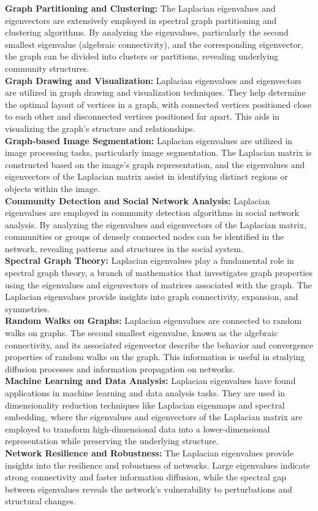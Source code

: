 \documentclass{article}
\begin{document}
    \textbf {Graph Partitioning and Clustering:} The Laplacian eigenvalues and eigenvectors are extensively employed in spectral graph partitioning and clustering algorithms. By analyzing the eigenvalues, particularly the second smallest eigenvalue (algebraic connectivity), and the corresponding eigenvector, the graph can be divided into clusters or partitions, revealing underlying community structures.\\
    \textbf {Graph Drawing and Visualization:} Laplacian eigenvalues and eigenvectors are utilized in graph drawing and visualization techniques. They help determine the optimal layout of vertices in a graph, with connected vertices positioned close to each other and disconnected vertices positioned far apart. This aids in visualizing the graph's structure and relationships.\\
    \textbf {Graph-based Image Segmentation:} Laplacian eigenvalues are utilized in image processing tasks, particularly image segmentation. The Laplacian matrix is constructed based on the image's graph representation, and the eigenvalues and eigenvectors of the Laplacian matrix assist in identifying distinct regions or objects within the image.\\
    \textbf {Community Detection and Social Network Analysis:} Laplacian eigenvalues are employed in community detection algorithms in social network analysis. By analyzing the eigenvalues and eigenvectors of the Laplacian matrix, communities or groups of densely connected nodes can be identified in the network, revealing patterns and structures in the social system.\\
    \textbf {Spectral Graph Theory:} Laplacian eigenvalues play a fundamental role in spectral graph theory, a branch of mathematics that investigates graph properties using the eigenvalues and eigenvectors of matrices associated with the graph. The Laplacian eigenvalues provide insights into graph connectivity, expansion, and symmetries.\\
    \textbf {Random Walks on Graphs:} Laplacian eigenvalues are connected to random walks on graphs. The second smallest eigenvalue, known as the algebraic connectivity, and its associated eigenvector describe the behavior and convergence properties of random walks on the graph. This information is useful in studying diffusion processes and information propagation on networks.\\
    \textbf {Machine Learning and Data Analysis:} Laplacian eigenvalues have found applications in machine learning and data analysis tasks. They are used in dimensionality reduction techniques like Laplacian eigenmaps and spectral embedding, where the eigenvalues and eigenvectors of the Laplacian matrix are employed to transform high-dimensional data into a lower-dimensional representation while preserving the underlying structure.\\
    \textbf {Network Resilience and Robustness:} The Laplacian eigenvalues provide insights into the resilience and robustness of networks. Large eigenvalues indicate strong connectivity and faster information diffusion, while the spectral gap between eigenvalues reveals the network's vulnerability to perturbations and structural changes.
\end{document}

